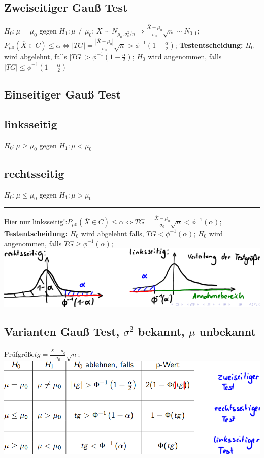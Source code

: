 \subsection{Zweiseitiger Gauß Test}
$ H_{0}: \mu = \mu_{0}  $ gegen $ H_{1}: \mu \neq \mu_{0} $; 
$ \overline{ X } \sim  N_{ \mu_{0}, \sigma_{0}^2 /n} \Rightarrow \frac{ \overline{X} - \mu_{0} }{ \sigma_{0} } \sqrt{n} \sim N_{0, 1} $; 
$ P_{ \mu0}( \overline{X} \in C ) \le \alpha \Leftrightarrow |TG| = \frac{ | \overline{X} - \mu_{0} | }{ \sigma_{0} } \sqrt{n} > \phi^{-1}(1-\frac{ \alpha}{2} )$; 
\textbf{Testentscheidung:} $ H_{0} $ wird abgelehnt, falls $ |TG| > \phi^{-1}(1-\frac{ \alpha }{ 2 } ) $; $ H_{0} $ wird angenommen, falls $ |TG| \le \phi^{-1}(1-\frac{ \alpha }{2} )$
\subsection{Einseitiger Gauß Test}
\subsection{linksseitig}
$ H_{0}: \mu \ge \mu_{0} $ gegen $ H_{1}: \mu  < \mu_{0}$
\subsection{rechtsseitig}
$ H_{0}: \mu \le \mu_{0} $ gegen $ H_{1}: \mu > \mu_{0} $
\hrule
Hier nur linksseitig!:$ P_{\mu 0} ( \overline{X} \in C ) \le \alpha \Leftrightarrow TG = \frac{ \overline{ X } - \mu_{0} }{ \sigma_{0} } \sqrt{n} < \phi^{-1} ( \alpha ) $; 
\textbf{Testentscheidung:} $ H_{0} $ wird abgelehnt falls, $ TG < \phi^{-1} ( \alpha )$; 
$ H_{0} $ wird angenommen, falls $ TG \ge \phi^{-1} ( \alpha ) $; 
\includegraphics[scale=0.25]{./pic/EinseitigerGausTest.png}
\subsection{Varianten Gauß Test, $ \sigma^2 $ bekannt, $\mu$ unbekannt}
Prüfgröße$ tg = \frac{ \overline{X} - \mu_{0} }{ \sigma_{0} }\sqrt{n} $; \\
\includegraphics[scale=0.25]{./pic/GausTests.png}
